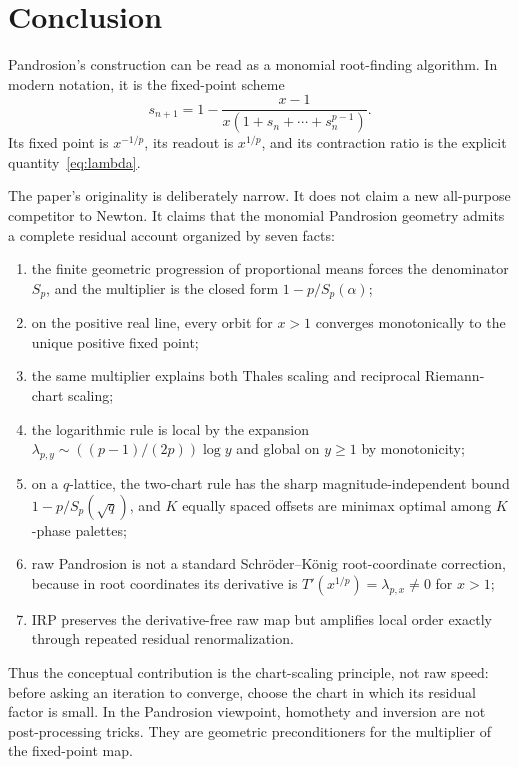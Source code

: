 \documentclass[10pt,a4paper]{article}
\theoremstyle{plain}
\theoremstyle{definition}
\theoremstyle{remark}
\begin{document}
\section{Conclusion}
\label{sec:conclusion}

Pandrosion's construction can be read as a monomial root-finding algorithm.  In
modern notation, it is the fixed-point scheme
\[
  s_{n+1}=1-\frac{x-1}{x(1+s_n+\cdots+s_n^{p-1})}.
\]
Its fixed point is $x^{-1/p}$, its readout is $x^{1/p}$, and its contraction
ratio is the explicit quantity~\eqref{eq:lambda}.

The paper's originality is deliberately narrow.  It does not claim a new
all-purpose competitor to Newton.  It claims that the monomial Pandrosion
geometry admits a complete residual account organized by seven facts:
\begin{enumerate}
  \item the finite geometric progression of proportional means forces the
  denominator $S_p$, and the multiplier is the closed form
  $1-p/S_p(\alpha)$;
  \item on the positive real line, every orbit for $x>1$ converges monotonically
  to the unique positive fixed point;
  \item the same multiplier explains both Thales scaling and reciprocal
  Riemann-chart scaling;
  \item the logarithmic rule is local by the expansion
  $\lambda_{p,y}\sim ((p-1)/(2p))\log y$ and global on $y\ge1$ by
  monotonicity;
  \item on a $q$-lattice, the two-chart rule has the sharp
  magnitude-independent bound $1-p/S_p(\sqrt q)$, and $K$ equally spaced
  offsets are minimax optimal among $K$-phase palettes;
  \item raw Pandrosion is not a standard Schröder--König root-coordinate
  correction, because in root coordinates its derivative is
  $T'(x^{1/p})=\lambda_{p,x}\ne0$ for $x>1$;
  \item IRP preserves the derivative-free raw map but amplifies local order
  exactly through repeated residual renormalization.
\end{enumerate}

Thus the conceptual contribution is the chart-scaling principle, not raw speed:
before asking an iteration to converge, choose the chart in which its residual
factor is small.  In the Pandrosion viewpoint, homothety and inversion are not
post-processing tricks.  They are geometric preconditioners for the multiplier
of the fixed-point map.
\end{document}
